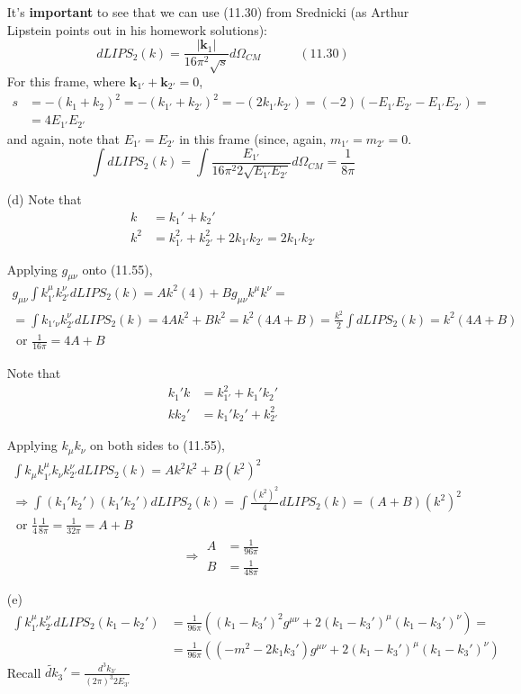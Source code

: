 \documentclass[twoside]{amsart}
\begin{document}
\begin{itemize}
It's \textbf{important} to see that we can use (11.30) from Srednicki (as Arthur Lipstein points out in his homework solutions):
\[
dLIPS_2(k) = \frac{ |\mathbf{k}_1|}{ 16 \pi^2 \sqrt{s}} d\Omega_{CM} \quad \quad \quad (11.30)
\]
For this frame, where $\mathbf{k}_{1'} + \mathbf{k}_{2'} =0$,
\[
\begin{aligned}
  s & = -(k_1 + k_2)^2 = - (k_{1'} + k_{2'})^2 = -(2k_{1'} k_{2'}) = (-2)(-E_{1'} E_{2'} - E_{1'} E_{2'} ) = \\
  & = 4E_{1'} E_{2'}
\end{aligned}
\]
and again, note that $E_{1'} = E_{2'}$ in this frame (since, again, $m_{1'} = m_{2'} =0$.  
\[
\int dLIPS_2(k) = \int \frac{ E_{1'}}{ 16 \pi^2 2 \sqrt{ E_{1'} E_{2'}} } d\Omega_{CM} = \boxed{ \frac{1}{8\pi}}
\]
\item[(d)] 
Note that
\[
\begin{aligned}
  k & = k_1' + k_2' \\ 
  k^2 & = k_{1'}^2 + k_{2'}^2 + 2k_{1'}k_{2'} = 2k_{1'} k_{2'}
\end{aligned}
\]

Applying $g_{\mu \nu}$ onto (11.55), 
\[
\begin{gathered}
  g_{\mu \nu} \int k_{1'}^{\mu} k_{2'}^{\nu} dLIPS_2(k) = Ak^2 ( 4) + B g_{\mu \nu} k^{\mu} k^{\nu} = \\
= \int k_{1'\nu} k_{2'}^{\nu} dLIPS_2(k) = 4Ak^2 + Bk^2 = k^2 ( 4A + B) = \frac{k^2}{2} \int dLIPS_2(k) = k^2 ( 4A + B) \\ \text{ or } \frac{1}{16\pi} = 4A + B
\end{gathered}
\]

Note that 
\[
\begin{aligned}
  k_1' k & = k_{1'}^2 + k_1' k_2' \\ 
  kk_2' & = k_1'k_2' + k_{2'}^2 
\end{aligned}
\]

Applying $k_{\mu} k_{\nu}$ on both sides to (11.55), 
\[
\begin{gathered}
  \int k_{\mu} k_{1'}^{\mu} k_{\nu} k_{2'}^{\nu} dLIPS_2(k) = Ak^2 k^2 + B(k^2)^2 \\ 
  \Longrightarrow \int (k_1' k_2')(k_1' k_2') dLIPS_2(k) = \int \frac{(k^2)^2}{4} dLIPS_2(k) = (A+B)(k^2)^2 \\ 
  \text{ or } \frac{1}{4} \frac{1}{8\pi} = \frac{1}{32 \pi} = A+B
\end{gathered}
\]
\[
\Longrightarrow \boxed{ \begin{aligned} A & = \frac{1}{96 \pi}  \\ B & = \frac{1}{48 \pi} \end{aligned} }
\]
\item[(e)] \[
\begin{aligned}
  \int k_{1'}^{\mu} k_{2'}^{\nu} dLIPS_2(k_1-k_2') & = \frac{1}{96 \pi} ((k_1-k_3')^2 g^{\mu \nu} + 2(k_1-k_3')^{\mu}(k_1-k_3')^{\nu} ) = \\
& =   \frac{1}{96 \pi} ((-m^2 - 2k_1k_3')g^{\mu \nu} + 2(k_1 - k_3')^{\mu}(k_1-k_3')^{\nu})
\end{aligned}
\]
Recall $\widetilde{dk}_3' = \frac{ d^3 k_{3'}}{ (2\pi)^3 2 E_{3'}}$


\end{itemize}
\end{document}
